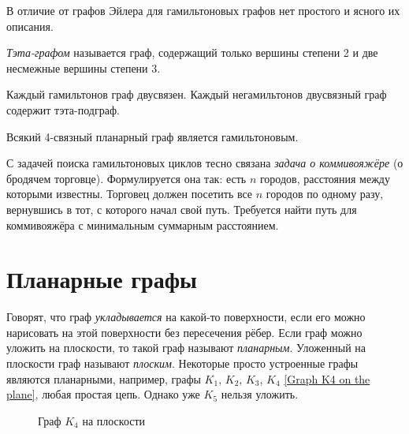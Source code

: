 В отличие от графов Эйлера для гамильтоновых графов нет простого и
ясного их описания.

\emph{Тэта-графом} называется граф, содержащий только вершины степени 2 и две 
несмежные вершины степени 3.

\begin{theorem}
Каждый гамильтонов граф двусвязен. Каждый негамильтонов двусвязный граф 
содержит тэта-подграф.
\end{theorem}

\begin{theorem}[У. Татт, 1946г.]
Всякий 4-связный планарный граф является гамильтоновым.
\end{theorem}

С задачей поиска гамильтоновых циклов тесно связана \emph{задача о 
коммивояжёре} (о бродячем торговце). Формулируется она так: есть $n$ городов,
расстояния между которыми известны. Торговец должен посетить все $n$ городов по 
одному разу, вернувшись в тот, с которого начал свой путь. Требуется найти путь 
для коммивояжёра с минимальным суммарным расстоянием.

\section{Планарные графы}

Говорят, что граф \emph{укладывается} на какой-то поверхности, если его можно 
нарисовать на этой поверхности без пересечения рёбер. Если граф можно уложить 
на плоскости, то такой граф называют \emph{планарным}. Уложенный на плоскости 
граф называют \emph{плоским}. Некоторые просто устроенные графы являются 
планарными, например, графы $K_1$, $K_2$, $K_3$, $K_4$ \ref{Graph K4 on the 
plane}, любая простая цепь. Однако уже $K_5$ нельзя уложить.

\begin{figure}[h]
	\center
	\caption{Граф $K_4$ на плоскости}
	\label{Graph K4 on the plane}
\end{figure}

